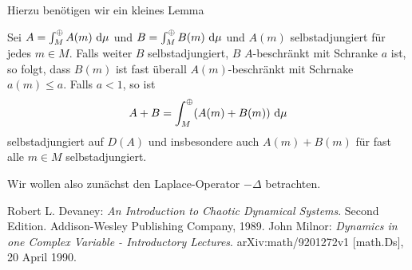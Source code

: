 \documentclass{mywork}
\begin{document}
Hierzu benötigen wir ein kleines Lemma
\begin{lem}
Sei $A=\int_{M}^\oplus A(m) \, \dx[\mu]$ und $B=\int_{M}^\oplus B(m)\, \dx[\mu]$ und $A(m)$ selbstadjungiert für jedes $m\in M$. Falls weiter $B$ selbstadjungiert, $B$ $A$-beschränkt mit Schranke $a$ ist, so folgt, dass $B(m)$ ist fast überall $A(m)$-beschränkt  mit Schrnake $a(m)\le a$. Falls $a<1$, so ist
\[
A+B = \int_M^\oplus (A(m)+B(m))\, \dx[\mu]
\]
selbstadjungiert auf $D(A)$ und insbesondere auch $A(m)+B(m)$ für fast alle $m\in M$ selbstadjungiert.  
\end{lem}

Wir wollen also zunächst den Laplace-Operator $-\Delta$ betrachten.
\begin{lem}

\end{lem}


\begin{thebibliography}{tief}
 Robert L. Devaney: {\it An Introduction to Chaotic Dynamical Systems}. Second Edition.
                     Addison-Wesley Publishing Company, 1989.
 John Milnor: {\it Dynamics in one Complex Variable - Introductory Lectures}.  arXiv:math/9201272v1 [math.Ds], 20 April 1990.
\end{thebibliography} 
\end{document}
